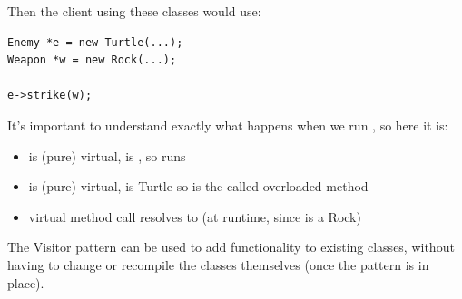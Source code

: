 \documentclass[english, 11pt]{article}
\begin{document}
Then the client using these classes would use:

\begin{lstlisting}
Enemy *e = new Turtle(...);
Weapon *w = new Rock(...);

e->strike(w);
\end{lstlisting}

It's important to understand exactly what happens when we run , so here it is:

\begin{itemize}
  \item {} is (pure) virtual,  is , so  runs
  \item {} is (pure) virtual,  is Turtle so  is the called overloaded method
  \item virtual method call resolves to  (at runtime, since  is a Rock)
\end{itemize}

The Visitor pattern can be used to add functionality to existing classes, without having to change or recompile the classes themselves (once the pattern is in place).
\end{document}
